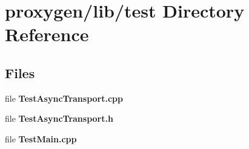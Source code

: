 \section{proxygen/lib/test Directory Reference}
\label{dir_9548c06b8a138043d2bc571a1114c8ff}
\subsection*{Files}
\begin{DoxyCompactItemize}
\item 
file {\bf Test\+Async\+Transport.\+cpp}
\item 
file {\bf Test\+Async\+Transport.\+h}
\item 
file {\bf Test\+Main.\+cpp}
\end{DoxyCompactItemize}
